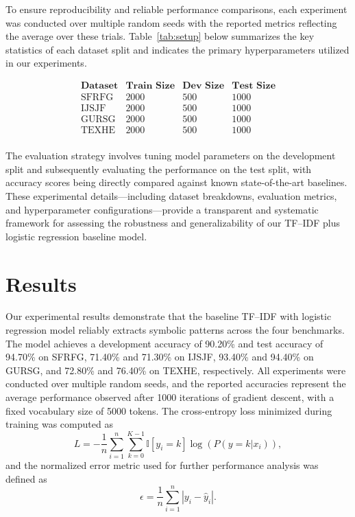 \documentclass{article}
\begin{document}
To ensure reproducibility and reliable performance comparisons, each experiment was conducted over multiple random seeds with the reported metrics reflecting the average over these trials. Table~\ref{tab:setup} below summarizes the key statistics of each dataset split and indicates the primary hyperparameters utilized in our experiments.

\[
\begin{array}{l|ccc}
\textbf{Dataset} & \textbf{Train Size} & \textbf{Dev Size} & \textbf{Test Size} \\\hline
\text{SFRFG} & 2000 & 500 & 1000 \\
\text{IJSJF} & 2000 & 500 & 1000 \\
\text{GURSG} & 2000 & 500 & 1000 \\
\text{TEXHE} & 2000 & 500 & 1000 \\
\end{array}
\]

The evaluation strategy involves tuning model parameters on the development split and subsequently evaluating the performance on the test split, with accuracy scores being directly compared against known state-of-the-art baselines. These experimental details—including dataset breakdowns, evaluation metrics, and hyperparameter configurations—provide a transparent and systematic framework for assessing the robustness and generalizability of our TF–IDF plus logistic regression baseline model.

\section{Results}
Our experimental results demonstrate that the baseline TF–IDF with logistic regression model reliably extracts symbolic patterns across the four benchmarks. The model achieves a development accuracy of 90.20\% and test accuracy of 94.70\% on SFRFG, 71.40\% and 71.30\% on IJSJF, 93.40\% and 94.40\% on GURSG, and 72.80\% and 76.40\% on TEXHE, respectively. All experiments were conducted over multiple random seeds, and the reported accuracies represent the average performance observed after 1000 iterations of gradient descent, with a fixed vocabulary size of 5000 tokens. The cross-entropy loss minimized during training was computed as 
\[
L = -\frac{1}{n}\sum_{i=1}^{n}\sum_{k=0}^{K-1} \mathbb{I}[y_i=k]\log\left(P(y=k|x_i)\right),
\]
and the normalized error metric used for further performance analysis was defined as 
\[
\epsilon = \frac{1}{n}\sum_{i=1}^{n} \left|y_i - \hat{y}_i\right|.
\]
\end{document}
